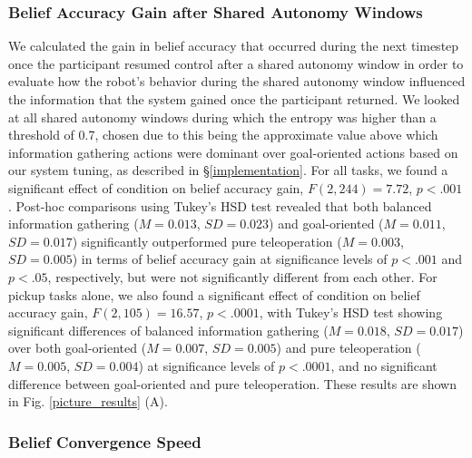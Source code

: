 \documentclass[conference]{IEEEtran}
\begin{document}
\subsubsection{Belief Accuracy Gain after Shared Autonomy Windows}
We calculated the gain in belief accuracy that occurred during the next timestep once the participant resumed control after a shared autonomy window in order to evaluate how the robot's behavior during the shared autonomy window influenced the information that the system gained once the participant returned. We looked at all shared autonomy windows during which the entropy was higher than a threshold of 0.7, chosen due to this being the approximate value above which information gathering actions were dominant over goal-oriented actions based on our system tuning, as described in \S\ref{implementation}. For all tasks, we found a significant effect of condition on belief accuracy gain, $F(2, 244) = 7.72$, $p < .001$. Post-hoc comparisons using Tukey's HSD test revealed that both balanced information gathering ($M = 0.013$, $SD = 0.023$) and goal-oriented ($M = 0.011$, $SD = 0.017$) significantly outperformed pure teleoperation ($M = 0.003$, $SD = 0.005$) in terms of belief accuracy gain at significance levels of $p < .001$ and $p < .05$, respectively, but were not significantly different from each other. For pickup tasks alone, we also found a significant effect of condition on belief accuracy gain, $F(2, 105) = 16.57$, $p < .0001$, with Tukey's HSD test showing significant differences of balanced information gathering ($M = 0.018$, $SD = 0.017$) over both goal-oriented ($M = 0.007$, $SD = 0.005$) and pure teleoperation ($M = 0.005$, $SD = 0.004$) at significance levels of $p < .0001$,  and no significant difference between goal-oriented and pure teleoperation. These results are shown in Fig. \ref{picture_results} (A).

\subsubsection{Belief Convergence Speed}
\end{document}
